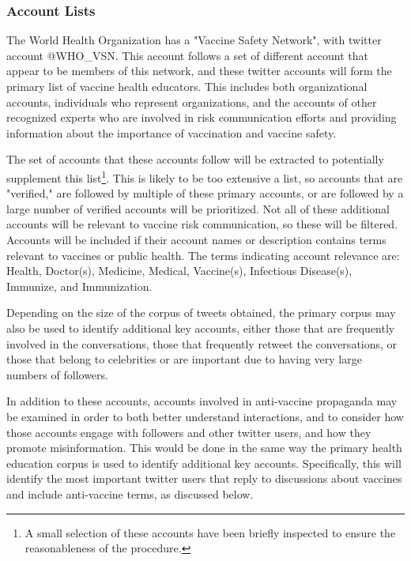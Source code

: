 \documentclass{article}
\begin{document}
\subsubsection{Account Lists}

The World Health Organization has a "Vaccine Safety Network", with twitter account @WHO\_VSN. This account follows a set of different account that appear to be members of this network, and these twitter accounts will form the primary list of vaccine health educators.  This includes both organizational accounts, individuals who represent organizations, and the accounts of other recognized experts who are involved in risk communication efforts and providing information about the importance of vaccination and vaccine safety.

The set of accounts that these accounts follow will be extracted to potentially supplement this list\footnote{A small selection of these accounts have been briefly inspected to ensure the reasonableness of the procedure.}. This is likely to be too extensive a list, so accounts that are "verified," are followed by multiple of these primary accounts, or are followed by a large number of verified accounts will be prioritized. Not all of these additional accounts will be relevant to vaccine risk communication, so these will be filtered. Accounts will be included if their account names or description contains terms relevant to vaccines or public health. The terms indicating account relevance are: Health, Doctor(s), Medicine, Medical, Vaccine(s), Infectious Disease(s), Immunize, and Immunization.

Depending on the size of the corpus of tweets obtained, the primary corpus may also be used to identify additional key accounts, either those that are frequently involved in the conversations, those that frequently retweet the conversations, or those that belong to celebrities or are important due to having very large numbers of followers.

In addition to these accounts, accounts involved in anti-vaccine propaganda may be examined in order to both better understand interactions, and to consider how those accounts engage with followers and other twitter users, and how they promote misinformation. This would be done in the same way the primary health education corpus is used to identify additional key accounts. Specifically, this will identify the most important twitter users that reply to discussions about vaccines and include anti-vaccine terms, as discussed below.
\end{document}
